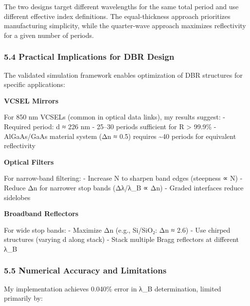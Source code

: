 \documentclass[
]{article}
\begin{document}
The two designs target different wavelengths for the same total period
and use different effective index definitions. The equal-thickness
approach prioritizes manufacturing simplicity, while the quarter-wave
approach maximizes reflectivity for a given number of periods.

\subsubsection{5.4 Practical Implications for DBR
Design}\label{practical-implications-for-dbr-design}

The validated simulation framework enables optimization of DBR
structures for specific applications:

\textbf{VCSEL Mirrors}

For 850 nm VCSELs (common in optical data links), my results suggest: -
Required period: d ≈ 226 nm - 25--30 periods sufficient for R
\textgreater{} 99.9\% - AlGaAs/GaAs material system (Δn ≈ 0.5) requires
\textasciitilde40 periods for equivalent reflectivity

\textbf{Optical Filters}

For narrow-band filtering: - Increase N to sharpen band edges (steepness
∝ N) - Reduce Δn for narrower stop bands (Δλ/λ\_B ∝ Δn) - Graded
interfaces reduce sidelobes

\textbf{Broadband Reflectors}

For wide stop bands: - Maximize Δn (e.g., Si/SiO₂: Δn ≈ 2.6) - Use
chirped structures (varying d along stack) - Stack multiple Bragg
reflectors at different λ\_B

\subsubsection{5.5 Numerical Accuracy and
Limitations}\label{numerical-accuracy-and-limitations}

My implementation achieves 0.040\% error in λ\_B determination, limited
primarily by:
\end{document}

